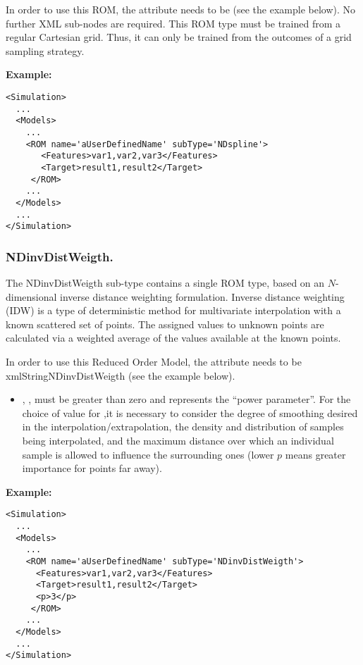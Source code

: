 In order to use this ROM, the  attribute  needs to
be  (see the example below).
%
No further XML sub-nodes are required.
%
\nb This ROM type must be trained from a regular Cartesian grid.
%
Thus, it can only be trained from the outcomes of a grid sampling strategy.

\textbf{Example:}
\begin{lstlisting}[style=XML,morekeywords={name,subType}]
<Simulation>
  ...
  <Models>
    ...
    <ROM name='aUserDefinedName' subType='NDspline'>
       <Features>var1,var2,var3</Features>
       <Target>result1,result2</Target>
     </ROM>
    ...
  </Models>
  ...
</Simulation>
\end{lstlisting}
\subsubsection{NDinvDistWeigth.}
\label{subsubsec:NDinvDistWeigth}
The NDinvDistWeigth sub-type contains a single ROM type, based on an
$N$-dimensional inverse distance weighting formulation.
%
Inverse distance weighting (IDW) is a type of deterministic method for
multivariate interpolation with a known scattered set of points.
%
The assigned values to unknown points are calculated via a weighted average of
the values available at the known points.
%

In order to use this Reduced Order Model, the  attribute
 needs to be xmlString{NDinvDistWeigth} (see the example 
below).
%
\subnodeIntro

\begin{itemize}
  \item {}, , must be greater than
  zero and represents the ``power parameter''.
  For the choice of value for ,it is necessary to consider the degree
  of smoothing desired in the interpolation/extrapolation, the density and
  distribution of samples being interpolated, and the maximum distance over
  which an individual sample is allowed to influence the surrounding ones (lower
  $p$ means greater importance for points far away).
\end{itemize}

\textbf{Example:}
\begin{lstlisting}[style=XML,morekeywords={name,subType}]
<Simulation>
  ...
  <Models>
    ...
    <ROM name='aUserDefinedName' subType='NDinvDistWeigth'>
      <Features>var1,var2,var3</Features>
      <Target>result1,result2</Target>
      <p>3</p>
     </ROM>
    ...
  </Models>
  ...
</Simulation>
\end{lstlisting}
